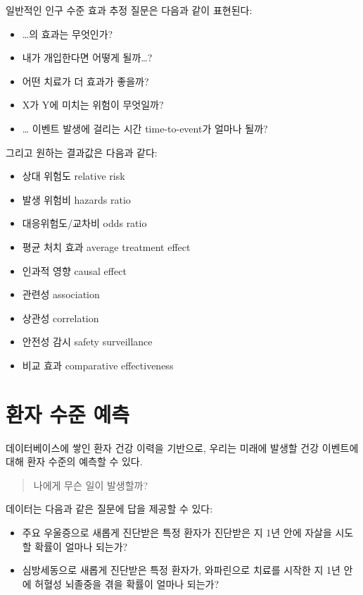 \documentclass[10.5pt]{book}
\providecommand{\tightlist}{%
  \setlength{\itemsep}{0pt}\setlength{\parskip}{0pt}}
\theoremstyle{definition}
\theoremstyle{definition}
\theoremstyle{definition}
\theoremstyle{remark}
\begin{document}
일반적인 인구 수준 효과 추정 질문은 다음과 같이 표현된다:

\begin{itemize}
\tightlist
\item
  \ldots{}의 효과는 무엇인가?
\item
  내가 개입한다면 어떻게 될까\ldots{}?
\item
  어떤 치료가 더 효과가 좋을까?
\item
  X가 Y에 미치는 위험이 무엇일까?
\item
  \ldots{} 이벤트 발생에 걸리는 시간 time-to-event가 얼마나 될까?
\end{itemize}

그리고 원하는 결과값은 다음과 같다:

\begin{itemize}
\tightlist
\item
  상대 위험도 relative risk
\item
  발생 위험비 hazards ratio
\item
  대응위험도/교차비 odds ratio
\item
  평균 처치 효과 average treatment effect
\item
  인과적 영향 causal effect
\item
  관련성 association
\item
  상관성 correlation
\item
  안전성 감시 safety surveillance
\item
  비교 효과 comparative effectiveness
\end{itemize}

\section{환자 수준 예측}\label{--}


데이터베이스에 쌓인 환자 건강 이력을 기반으로, 우리는 미래에 발생할 건강
이벤트에 대해 환자 수준의 예측할 수 있다.

\begin{quote}
나에게 무슨 일이 발생할까?
\end{quote}

데이터는 다음과 같은 질문에 답을 제공할 수 있다:

\begin{itemize}
\tightlist
\item
  주요 우울증으로 새롭게 진단받은 특정 환자가 진단받은 지 1년 안에
  자살을 시도할 확률이 얼마나 되는가?
\item
  심방세동으로 새롭게 진단받은 특정 환자가, 와파린으로 치료를 시작한 지
  1년 안에 허혈성 뇌졸중을 겪을 확률이 얼마나 되는가?
\end{itemize}
\end{document}

